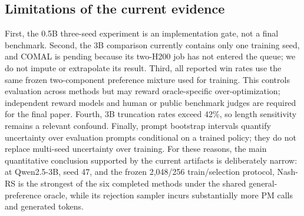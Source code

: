 \subsection{Limitations of the current evidence}
\label{sec:exp-limitations}

First, the 0.5B three-seed experiment is an implementation gate, not a final
benchmark.  Second, the 3B comparison currently contains only one training
seed, and COMAL is pending because its two-H200 job has not entered the queue;
we do not impute or extrapolate its result.  Third, all reported win rates use
the same frozen two-component preference mixture used for training.  This
controls evaluation across methods but may reward oracle-specific
over-optimization; independent reward models and human or public benchmark
judges are required for the final paper.  Fourth, 3B truncation rates exceed
42\%, so length sensitivity remains a relevant confound.  Finally, prompt
bootstrap intervals quantify uncertainty over evaluation prompts conditional
on a trained policy; they do not replace multi-seed uncertainty over training.
For these reasons, the main quantitative conclusion supported by the current
artifacts is deliberately narrow: at Qwen2.5-3B, seed 47, and the frozen
2,048/256 train/selection protocol, Nash-RS is the strongest of the six
completed methods under the shared general-preference oracle, while its
rejection sampler incurs substantially more PM calls and generated tokens.

